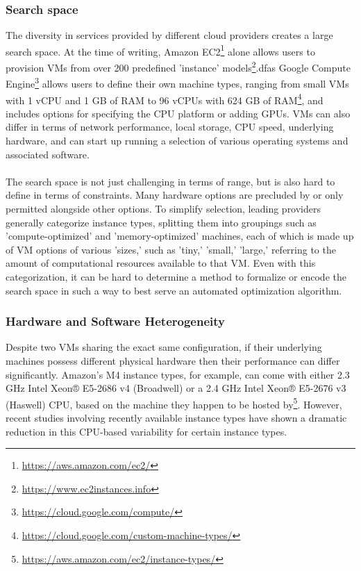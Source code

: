 \documentclass{report}
\begin{document}
\subsubsection{Search space}
The diversity in services provided by different cloud providers creates a large search space. At the time of writing, Amazon EC2\footnote{\url{https://aws.amazon.com/ec2/}} alone allows users to provision VMs from over 200 predefined 'instance' models\footnote{\url{https://www.ec2instances.info}}.dfas Google Compute Engine\footnote{\url{https://cloud.google.com/compute/}} allows users to define their own machine types, ranging from small VMs with 1 vCPU and 1 GB of RAM to 96 vCPUs with 624 GB of RAM\footnote{\url{https://cloud.google.com/custom-machine-types/}}, and includes options for specifying the CPU platform or adding GPUs. VMs can also differ in terms of network performance, local storage, CPU speed, underlying hardware, and can start up running a selection of various operating systems and associated software. 
\paragraph{}
The search space is not just challenging in terms of range, but is also hard to define in terms of constraints. Many hardware options are precluded by or only permitted alongside other options. To simplify selection, leading providers generally categorize instance types, splitting them into groupings such as 'compute-optimized' and 'memory-optimized' machines, each of which is made up of VM options of various 'sizes,' such as 'tiny,' 'small,' 'large,' referring to the amount of computational resources available to that VM. Even with this categorization, it can be hard to determine a method to formalize or encode the search space in such a way to best serve an automated optimization algorithm.

\subsubsection{Hardware and Software Heterogeneity}
Despite two VMs sharing the exact same configuration, if their underlying machines possess different physical hardware then their performance can differ significantly\cite{Leitner2014}. Amazon's M4 instance types, for example, can come with either 2.3 GHz Intel Xeon® E5-2686 v4 (Broadwell) or a 2.4 GHz Intel Xeon® E5-2676 v3 (Haswell) CPU, based on the machine they happen to be hosted by\footnote{\url{https://aws.amazon.com/ec2/instance-types/}}. However, recent studies involving recently available instance types have shown a dramatic reduction in this CPU-based variability for certain instance types\cite{Davatz2017, Laaber2019}. 
\end{document}
